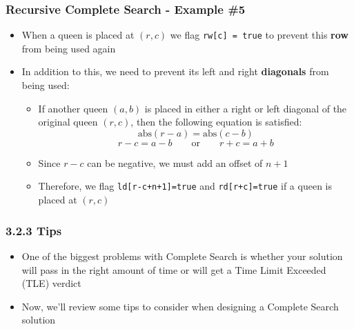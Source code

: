 \documentclass{beamer}
\begin{document}
\begin{frame}[fragile]
\frametitle{Recursive Complete Search - Example \#5}

\begin{itemize}
    \item When a queen is placed at $(r,c)$ we flag \color{blue}\verb|rw[c] = true| \color{black} to prevent this \textbf{row} from being used again
    \item In addition to this, we need to prevent its left and right \textbf{diagonals} from being used:
    	\begin{itemize}
		    \item If another queen $(a,b)$ is placed in either a right or left diagonal of the original queen $(r,c)$, then the following equation is satisfied: $$\text{abs}(r-a) = \text{abs}(c-b)$$ $$r-c = a-b \quad\quad\text{or}\quad\quad r+c=a+b$$
		    \item Since $r-c$ can be negative, we must add an offset of $n+1$
		    \item Therefore, we flag \color{blue}\verb|ld[r-c+n+1]=true| \color{black} and \color{blue}\verb|rd[r+c]=true| \color{black} if a queen is placed at $(r,c)$
		\end{itemize}
\end{itemize}

\end{frame}


\begin{frame}[fragile]
\frametitle{3.2.3 Tips}

\begin{itemize}
    \item One of the biggest problems with Complete Search is whether your solution will pass in the right amount of time or will get a Time Limit Exceeded (TLE) verdict
    \item Now, we'll review some tips to consider when designing a Complete Search solution
\end{itemize}

\end{frame}
\end{document}
